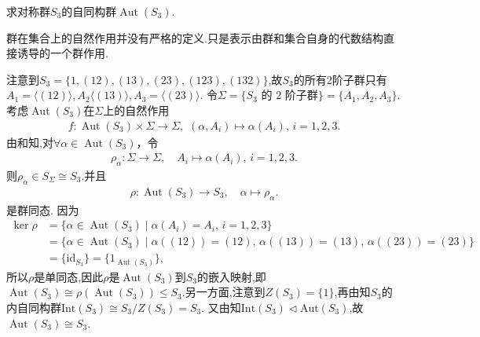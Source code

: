 \documentclass[../../main.tex]{subfiles}%
\begin{document}
\begin{example}
求对称群$S_3$的自同构群$\operatorname{Aut}(S_3)$.
\end{example}
\begin{remark}
群在集合上的自然作用并没有严格的定义.只是表示由群和集合自身的代数结构直接诱导的一个群作用.
\end{remark}
\begin{solution}

注意到$S_3=\{1, (12), (13), (23), (123), (132)\}$,故$S_3$的所有2阶子群只有$A_1=\langle (12)\rangle ,A_2\langle (13)\rangle ,A_3=\langle (23)\rangle $.
令$\Sigma = \{S_3 \text{ 的 } 2 \text{ 阶子群}\} = \{A_1, A_2, A_3\}$. 考虑$\operatorname{Aut}(S_3)$在$\Sigma$上的自然作用
\begin{align*}
f:\operatorname{Aut}(S_3) \times \Sigma \to \Sigma ,\,\,(\alpha,A_i)\mapsto \alpha(A_i),\,i=1,2,3.
\end{align*}
由和知,对$\forall \alpha \in \operatorname{Aut}(S_3)$，令
\begin{align*}
\rho_\alpha:\Sigma\rightarrow \Sigma,\quad A_i\mapsto \alpha(A_i),\,i=1,2,3.
\end{align*}
则$\rho_\alpha\in S_{\Sigma}\cong S_3$.并且
\begin{align*}
\rho:\operatorname{Aut}(S_3)\rightarrow S_3,\quad \alpha\mapsto \rho_\alpha.
\end{align*}
是群同态. 因为
\begin{align*}
\operatorname{ker} \rho &= \{\alpha \in \operatorname{Aut}(S_3) \mid \alpha(A_i) = A_i, \, i = 1, 2, 3\} \\
&= \{\alpha \in \operatorname{Aut}(S_3) \mid \alpha((12)) = (12), \, \alpha((13)) = (13), \, \alpha((23)) = (23)\} \\
&= \{\text{id}_{S_3}\}=\{1_{\operatorname{Aut}(S_3)}\},
\end{align*}
所以$\rho$是单同态,因此$\rho$是$\operatorname{Aut}(S_3)$到$ S_3$的嵌入映射,即$\operatorname{Aut}(S_3)\cong \rho(\operatorname{Aut}(S_3))\leqslant S_3$.另一方面,注意到$Z(S_3)=\{1\}$,再由知$S_3$的内自同构群$\text{Int}(S_3)\cong S_3 / Z(S_3) = S_3$. 又由知$\text{Int}(S_3)\lhd \text{Aut}(S_3)$,故
$\operatorname{Aut}(S_3) \cong S_3$.

\end{solution}
\end{document}
